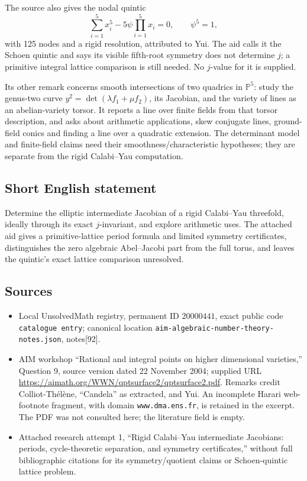 \documentclass[11pt]{article}
\newcommand{\PP}{\mathbb{P}}
\begin{document}
The source also gives the nodal quintic
\[
\sum_{i=1}^5x_i^5-5\psi\prod_{i=1}^5x_i=0,\qquad\psi^5=1,
\]
with 125 nodes and a rigid resolution, attributed to Yui. The aid calls it the Schoen quintic and says its visible fifth-root symmetry does not determine \(j\); a primitive integral lattice comparison is still needed. No \(j\)-value for it is supplied.

Its other remark concerns smooth intersections of two quadrics in \(\PP^5\): study the genus-two curve \(y^2=\det(\lambda f_1+\mu f_2)\), its Jacobian, and the variety of lines as an abelian-variety torsor. It reports a line over finite fields from that torsor description, and asks about arithmetic applications, skew conjugate lines, ground-field conics and finding a line over a quadratic extension. The determinant model and finite-field claims need their smoothness/characteristic hypotheses; they are separate from the rigid Calabi--Yau computation.
\subsection{Short English statement}
Determine the elliptic intermediate Jacobian of a rigid Calabi--Yau threefold, ideally through its exact \(j\)-invariant, and explore arithmetic uses. The attached aid gives a primitive-lattice period formula and limited symmetry certificates, distinguishes the zero algebraic Abel--Jacobi part from the full torus, and leaves the quintic's exact lattice comparison unresolved.
\subsection{Sources}
\begin{itemize}
\item Local UnsolvedMath registry, permanent ID \(20000441\), exact public code \texttt{catalogue entry}; canonical location \texttt{aim-algebraic-number-theory-notes.json}, notes[92].
\item AIM workshop ``Rational and integral points on higher dimensional varieties,'' Question 9, source version dated 22 November 2004; supplied URL \url{https://aimath.org/WWN/qptsurface2/qptsurface2.pdf}. Remarks credit Colliot-Th\'el\`ene, ``Candela'' as extracted, and Yui. An incomplete Harari web-footnote fragment, with domain \texttt{www.dma.ens.fr}, is retained in the excerpt. The PDF was not consulted here; the literature field is empty.
\item Attached research attempt 1, ``Rigid Calabi--Yau intermediate Jacobians: periods, cycle-theoretic separation, and symmetry certificates,'' without full bibliographic citations for its symmetry/quotient claims or Schoen-quintic lattice problem.
\end{itemize}
\end{document}
